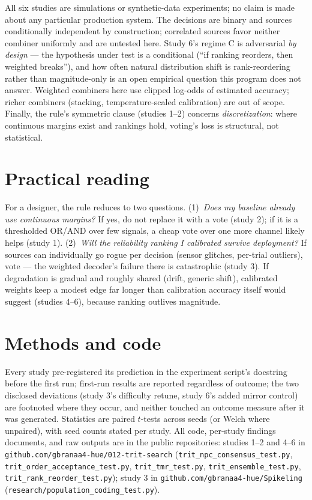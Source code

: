 \documentclass[aps,prapplied,preprint,amsmath,amssymb,floatfix]{revtex4-2}
\begin{document}
All six studies are simulations or synthetic-data experiments; no claim
is made about any particular production system. The decisions are binary
and sources conditionally independent by construction; correlated sources
favor neither combiner uniformly and are untested here. Study 6's regime
C is adversarial \emph{by design} --- the hypothesis under test is a
conditional (``if ranking reorders, then weighted breaks''), and how often
natural distribution shift is rank-reordering rather than magnitude-only
is an open empirical question this program does not answer. Weighted
combiners here use clipped log-odds of estimated accuracy; richer
combiners (stacking, temperature-scaled calibration) are out of scope.
Finally, the rule's symmetric clause (studies 1--2) concerns
\emph{discretization}: where continuous margins exist and rankings hold,
voting's loss is structural, not statistical.

\section{Practical reading}

For a designer, the rule reduces to two questions. (1)~\emph{Does my
baseline already use continuous margins?} If yes, do not replace it with
a vote (study 2); if it is a thresholded OR/AND over few signals, a
cheap vote over one more channel likely helps (study 1). (2)~\emph{Will
the reliability ranking I calibrated survive deployment?} If sources can
individually go rogue per decision (sensor glitches, per-trial outliers),
vote --- the weighted decoder's failure there is catastrophic (study 3).
If degradation is gradual and roughly shared (drift, generic shift),
calibrated weights keep a modest edge far longer than calibration
accuracy itself would suggest (studies 4--6), because ranking outlives
magnitude.

\section*{Methods and code}

Every study pre-registered its prediction in the experiment script's
docstring before the first run; first-run results are reported regardless
of outcome; the two disclosed deviations (study 3's difficulty retune,
study 6's added mirror control) are footnoted where they occur, and
neither touched an outcome measure after it was generated. Statistics are
paired $t$-tests across seeds (or Welch where unpaired), with seed counts
stated per study. All code, per-study findings documents, and raw outputs
are in the public repositories: studies 1--2 and 4--6 in
\texttt{github.com/gbranaa4-hue/012-trit-search} (\texttt{trit\_npc\_consensus\_test.py},
\texttt{trit\_order\_acceptance\_test.py}, \texttt{trit\_tmr\_test.py},
\texttt{trit\_ensemble\_test.py}, \texttt{trit\_rank\_reorder\_test.py});
study 3 in \texttt{github.com/gbranaa4-hue/Spikeling}
(\texttt{research/population\_coding\_test.py}).
\end{document}
